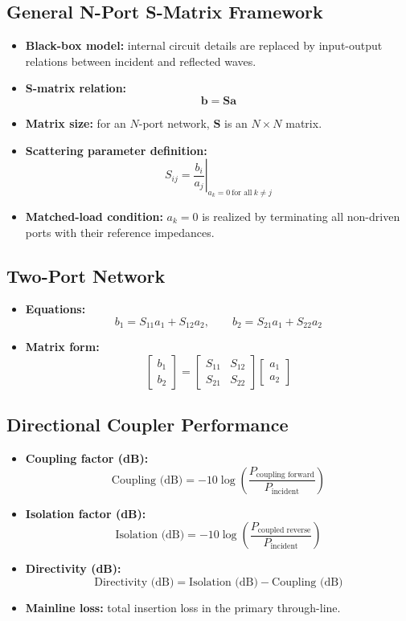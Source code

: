 \documentclass{article}
\begin{document}
\subsection*{General N-Port S-Matrix Framework}
\begin{itemize}
    \item \textbf{Black-box model:} internal circuit details are replaced by input-output relations between incident and reflected waves.
    \item \textbf{S-matrix relation:}
    \[
    \mathbf{b} = \mathbf{S}\mathbf{a}
    \]
    \item \textbf{Matrix size:} for an $N$-port network, $\mathbf{S}$ is an $N \times N$ matrix.
    \item \textbf{Scattering parameter definition:}
    \[
    S_{ij} = \left.\frac{b_i}{a_j}\right|_{a_k = 0 \ \text{for all}\ k \neq j}
    \]
    \item \textbf{Matched-load condition:} $a_k=0$ is realized by terminating all non-driven ports with their reference impedances.
\end{itemize}

\subsection*{Two-Port Network}
\begin{itemize}
    \item \textbf{Equations:}
    \[
    b_1 = S_{11}a_1 + S_{12}a_2, \qquad
    b_2 = S_{21}a_1 + S_{22}a_2
    \]
    \item \textbf{Matrix form:}
    \[
    \begin{bmatrix} b_1 \\ b_2 \end{bmatrix}
    =
    \begin{bmatrix}
    S_{11} & S_{12} \\
    S_{21} & S_{22}
    \end{bmatrix}
    \begin{bmatrix} a_1 \\ a_2 \end{bmatrix}
    \]
\end{itemize}


\subsection*{Directional Coupler Performance}
\begin{itemize}
    \item \textbf{Coupling factor (dB):}
    \[
    \text{Coupling (dB)} = -10\log\!\left(\frac{P_{\text{coupling forward}}}{P_{\text{incident}}}\right)
    \]
    \item \textbf{Isolation factor (dB):}
    \[
    \text{Isolation (dB)} = -10\log\!\left(\frac{P_{\text{coupled reverse}}}{P_{\text{incident}}}\right)
    \]
    \item \textbf{Directivity (dB):}
    \[
    \text{Directivity (dB)} = \text{Isolation (dB)} - \text{Coupling (dB)}
    \]
    \item \textbf{Mainline loss:} total insertion loss in the primary through-line.
\end{itemize}
\end{document}
